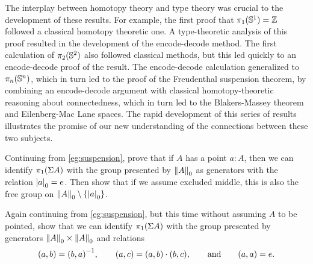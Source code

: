The interplay between homotopy theory and type theory was crucial to the
development of these results.  For example, the first proof that
$\pi_1(\Sn ^1)=\mathbb{Z}$ followed a classical homotopy theoretic one.  A
type-theoretic analysis of this proof resulted in the development of the
encode-decode method.  The first calculation of $\pi_2(\Sn ^2)$ also followed
classical methods, but this led quickly to an encode-decode proof of the
result.  The encode-decode calculation generalized to $\pi_n(\Sn ^n)$, which
in turn led to the proof of the Freudenthal suspension theorem, by
combining an encode-decode argument with classical homotopy-theoretic
reasoning about connectedness, which in turn led to the Blakers-Massey
theorem and Eilenberg-Mac Lane spaces.  The rapid development of this
series of results illustrates the promise of our new understanding of
the connections between these two subjects.

\sectionExercises

\begin{ex}\label{ex:vksusppt}
  Continuing from \autoref{eg:suspension}, prove that if $A$ has a point $a:A$, then we can identify $\pi_1(\susp A)$ with the group presented by $\trunc0A$ as generators with the relation $\tproj0a = e$.
  Then show that if we assume excluded middle, this is also the free group on $\trunc0 A \setminus \{\tproj0 a \}$.
\end{ex}

\begin{ex}\label{ex:vksuspnopt}
  Again continuing from \autoref{eg:suspension}, but this time without assuming $A$ to be pointed, show that we can identify $\pi_1(\susp A)$ with the group presented by generators $\trunc0A \times \trunc0A$ and relations
  \begin{equation*}
    (a,b) = \opp{(b,a)},
    \qquad
    (a,c) = (a,b)\cdot (b,c),
    \qquad\text{and}\qquad
    (a,a) = e.
  \end{equation*}
\end{ex}

